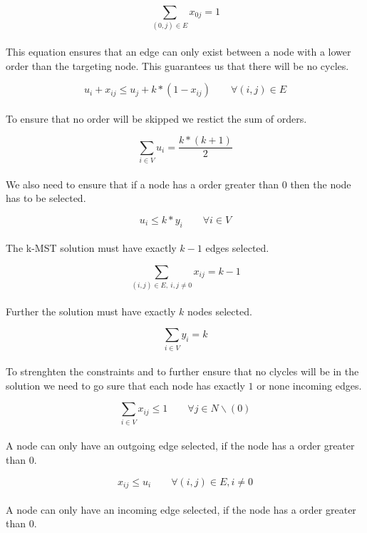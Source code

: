 \begin{equation}
  \sum_{(0,j) \in E} x_{0j} = 1 
\end{equation}
\\
This equation ensures that an edge can only exist between a node with a lower order than the targeting node. This guarantees us that there will be no cycles.

\begin{equation}
  u_{i} + x_{ij} \leq u_{j} + k*(1- x_{ij}) \qquad \forall (i,j) \in E 
\end{equation}
\\
To ensure that no order will be skipped we restict the sum of orders.

\begin{equation}
  \sum_{i \in V} u_i = \frac{k*(k+1)}{2} 
\end{equation}
\\
We also need to ensure that if a node has a order greater than $0$ then the node has to be selected.

\begin{equation}
  u_i \leq k*y_i \qquad \forall i \in V
\end{equation}
\\
The k-MST solution must have exactly $k-1$ edges selected.

\begin{equation}
  \sum_{(i,j) \in E, \ i,j \not =  0} x_{ij} = k-1 
\end{equation}
\\
Further the solution must have exactly $k$ nodes selected.

\begin{equation}
  \sum_{i \in V} y_i = k
\end{equation}
\\
To strenghten the constraints and to further ensure that no clycles will be in the solution we need to go sure that each node has exactly $1$ or none incoming edges.

\begin{equation}
  \sum_{i \in V} {x_{ij}} \leq 1 \qquad \forall j \in N \backslash (0)
\end{equation}
\\
A node can only have an outgoing edge selected, if the node has a order greater than $0$.

\begin{equation}
  x_{ij} \leq u_i \qquad \forall (i,j) \in E, i \neq 0
\end{equation}
\\
A node can only have an incoming edge selected, if the node has a order greater than $0$.

